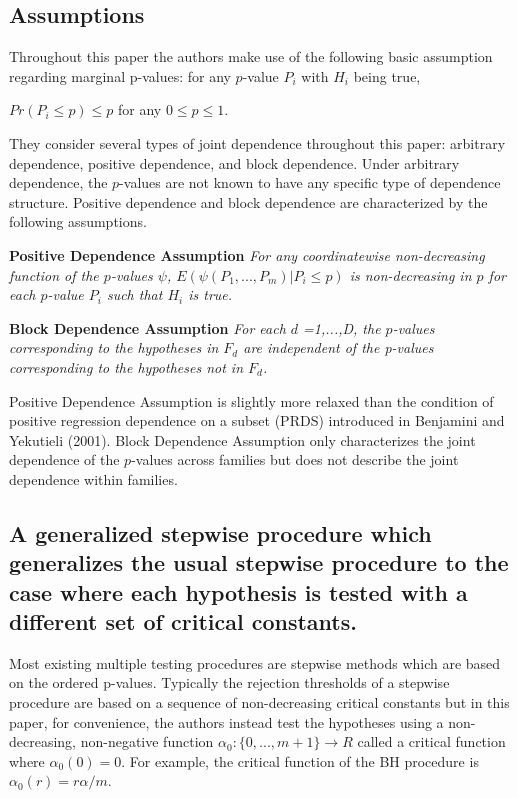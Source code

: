 \documentclass{article}
\begin{document}
\subsection{Assumptions}
Throughout this paper the authors make use of the following basic assumption regarding marginal p-values: for any $p$-value $P_i$ with $H_i$ being true,
\begin{center}
		$Pr(P_i \leq p) \leq p$ for any $0 \leq p \leq 1$. 
		
\end{center}	

They consider several types of joint dependence throughout this paper: arbitrary dependence, positive dependence, and block dependence. Under arbitrary dependence, the $p$-values are not known to have any specific type of dependence structure. Positive dependence and block dependence are characterized by the following assumptions.

\textbf{Positive Dependence Assumption}
\textit{For any coordinatewise non-decreasing function of the $p$-values $\psi$, $E(\psi(P_1,...,P_m)|P_i \leq p)$ is non-decreasing in $p$ for each $p$-value $P_i$ such that $H_i$ is true.}

\textbf{Block Dependence Assumption}
\textit{For each $d$ =1,...,D, the $p$-values corresponding to the hypotheses in $F_d$ are independent of the p-values corresponding to the hypotheses not in $F_d$.}

Positive Dependence Assumption is slightly more relaxed than the condition of positive regression dependence on a subset (PRDS) introduced in Benjamini and Yekutieli (2001). Block Dependence Assumption only characterizes the joint dependence of the $p$-values across families but does not describe the joint dependence within families.

\subsection{A generalized stepwise procedure which generalizes the usual stepwise procedure to the case where each hypothesis is tested with a different set of critical constants.}
Most existing multiple testing procedures are stepwise methods which are based on the ordered p-values. Typically the rejection thresholds of a stepwise procedure are based on a sequence of non-decreasing critical constants but in this paper, for convenience, the authors instead test the hypotheses using a non-decreasing, non-negative function $\alpha_0 : \{0,...,m + 1\} \rightarrow R$ called a critical function where $\alpha_0(0) = 0$. For example, the critical function of the BH procedure is $\alpha_0(r) = r\alpha/m$. 
\end{document}
